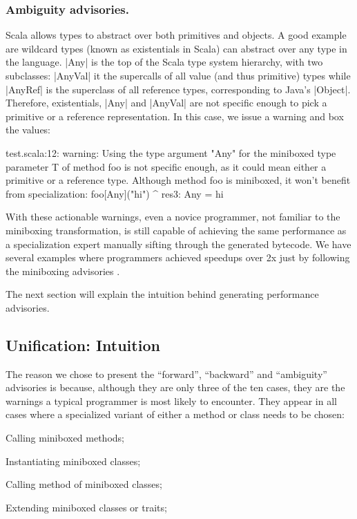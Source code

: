 \subsubsection{Ambiguity advisories.} Scala allows types to abstract over both primitives and objects. A good example are wildcard types (known as existentials in Scala) can abstract over any type in the language. |Any| is the top of the Scala type system hierarchy, with two subclasses: |AnyVal| it the supercalls of all value (and thus primitive) types while |AnyRef| is the superclass of all reference types, corresponding to Java's |Object|. Therefore, existentials, |Any| and |AnyVal| are not specific enough to pick a primitive or a reference representation. In this case, we issue a warning and box the values:

\begin{lstlisting-nobreak-nolang}
test.scala:12: warning: Using the type argument "Any" for the miniboxed type parameter T of method foo is not specific enough, as it could mean either a primitive or a reference type. Although method foo is miniboxed, it won't benefit from specialization:
              foo[Any]("hi")
                   ^
res3: Any = hi
\end{lstlisting-nobreak-nolang}

With these actionable warnings, even a novice programmer, not familiar to the miniboxing transformation, is still capable of achieving the same performance as a specialization expert manually sifting through the generated bytecode. We have several examples where programmers achieved speedups over 2x just by following the miniboxing advisories \cite{miniboxing-www,tixxit-respecialization6,pnwscala-pureimage}.

The next section will explain the intuition behind generating performance advisories.

\subsection{Unification: Intuition}

The reason we chose to present the ``forward'', ``backward'' and ``ambiguity'' advisories is because, although they are only three of the ten cases, they are the warnings a typical programmer is most likely to encounter. They appear in all cases where a specialized variant of either a method or class needs to be chosen:

\begin{compactitem}
 \item Calling miniboxed methods;
 \item Instantiating miniboxed classes;
 \item Calling method of miniboxed classes;
 \item Extending miniboxed classes or traits;
\end{compactitem}

